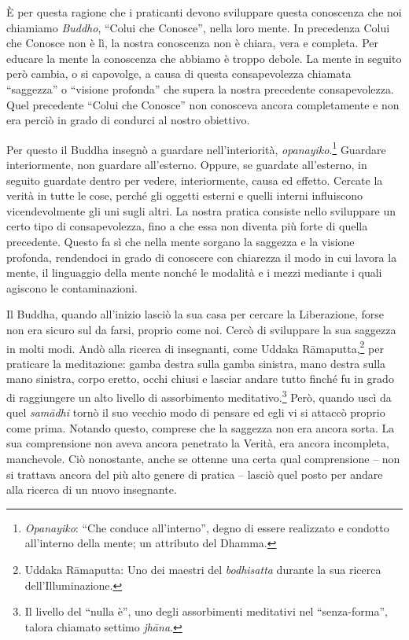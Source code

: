 È per questa ragione che i praticanti devono sviluppare questa
conoscenza che noi chiamiamo \emph{Buddho}, ``Colui che Conosce'', nella
loro mente. In precedenza Colui che Conosce non è lì, la nostra
conoscenza non è chiara, vera e completa. Per educare la mente la
conoscenza che abbiamo è troppo debole. La mente in seguito però cambia,
o si capovolge, a causa di questa consapevolezza chiamata ``saggezza'' o
``visione profonda'' che supera la nostra precedente consapevolezza.
Quel precedente ``Colui che Conosce'' non conosceva ancora completamente
e non era perciò in grado di condurci al nostro obiettivo.

Per questo il Buddha insegnò a guardare nell'interiorità,
\emph{opanayiko}.\footnote{\emph{Opanayiko}: ``Che conduce
  all'interno'', degno di essere realizzato e condotto all'interno
  della mente; un attributo del Dhamma.} Guardare interiormente, non
guardare all'esterno. Oppure, se guardate all'esterno, in seguito
guardate dentro per vedere, interiormente, causa ed effetto. Cercate la
verità in tutte le cose, perché gli oggetti esterni e quelli interni
influiscono vicendevolmente gli uni sugli altri. La nostra pratica
consiste nello sviluppare un certo tipo di consapevolezza, fino a che
essa non diventa più forte di quella precedente. Questo fa sì che nella
mente sorgano la saggezza e la visione profonda, rendendoci in grado di
conoscere con chiarezza il modo in cui lavora la mente, il linguaggio
della mente nonché le modalità e i mezzi mediante i quali agiscono le
contaminazioni.

Il Buddha, quando all'inizio lasciò la sua casa per cercare la
Liberazione, forse non era sicuro sul da farsi, proprio come noi. Cercò
di sviluppare la sua saggezza in molti modi. Andò alla ricerca di
insegnanti, come Uddaka Rāmaputta,\footnote{Uddaka Rāmaputta: Uno dei
  maestri del \emph{bodhisatta} durante la sua ricerca
  dell'Illuminazione.} per praticare la meditazione: gamba destra sulla
gamba sinistra, mano destra sulla mano sinistra, corpo eretto, occhi
chiusi e lasciar andare tutto finché fu in grado di raggiungere un alto
livello di assorbimento meditativo.\footnote{Il livello del ``nulla è'',
  uno degli assorbimenti meditativi nel ``senza-forma'', talora chiamato
  settimo \emph{jhāna}.} Però, quando uscì da quel \emph{samādhi} tornò
il suo vecchio modo di pensare ed egli vi si attaccò proprio come prima.
Notando questo, comprese che la saggezza non era ancora sorta. La sua
comprensione non aveva ancora penetrato la Verità, era ancora
incompleta, manchevole. Ciò nonostante, anche se ottenne una certa qual
comprensione -- non si trattava ancora del più alto genere di pratica --
lasciò quel posto per andare alla ricerca di un nuovo insegnante.

